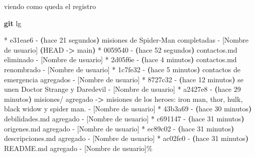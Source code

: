 \documentclass[
]{book}
\newenvironment{Shaded}{\begin{snugshade}}{\end{snugshade}}
\newcommand{\AttributeTok}[1]{\textcolor[rgb]{0.13,0.29,0.53}{#1}}
\newcommand{\ErrorTok}[1]{\textcolor[rgb]{0.64,0.00,0.00}{\textbf{#1}}}
\newcommand{\ExtensionTok}[1]{#1}
\newcommand{\FunctionTok}[1]{\textcolor[rgb]{0.13,0.29,0.53}{\textbf{#1}}}
\newcommand{\KeywordTok}[1]{\textcolor[rgb]{0.13,0.29,0.53}{\textbf{#1}}}
\newcommand{\NormalTok}[1]{#1}
\newcommand{\OperatorTok}[1]{\textcolor[rgb]{0.81,0.36,0.00}{\textbf{#1}}}
\begin{document}
viendo como queda el registro

\begin{Shaded}
\begin{Highlighting}[]
\FunctionTok{git}\NormalTok{ lg}
\end{Highlighting}
\end{Shaded}

\begin{Shaded}
\begin{Highlighting}[]
\ExtensionTok{*}\NormalTok{ e31eae6 }\AttributeTok{{-}} \ErrorTok{(}\ExtensionTok{hace}\NormalTok{ 21 segundos}\KeywordTok{)} \ExtensionTok{misiones}\NormalTok{ de Spider{-}Man completadas }\AttributeTok{{-}}\NormalTok{ [Nombre de usuario] }\ErrorTok{(}\ExtensionTok{HEAD} \AttributeTok{{-}}\OperatorTok{\textgreater{}}\NormalTok{ main}\KeywordTok{)}
\ExtensionTok{*}\NormalTok{ 0059540 }\AttributeTok{{-}} \ErrorTok{(}\ExtensionTok{hace}\NormalTok{ 52 segundos}\KeywordTok{)} \ExtensionTok{contactos.md}\NormalTok{ eliminado }\AttributeTok{{-}}\NormalTok{ [Nombre de usuario]}
\ExtensionTok{*}\NormalTok{ 2d05f6e }\AttributeTok{{-}} \ErrorTok{(}\ExtensionTok{hace}\NormalTok{ 4 minutos}\KeywordTok{)} \ExtensionTok{contactos.md}\NormalTok{ renombrado }\AttributeTok{{-}}\NormalTok{ [Nombre de usuario]}
\ExtensionTok{*}\NormalTok{ 1c7fe32 }\AttributeTok{{-}} \ErrorTok{(}\ExtensionTok{hace}\NormalTok{ 5 minutos}\KeywordTok{)} \ExtensionTok{contactos}\NormalTok{ de emergencia agregados }\AttributeTok{{-}}\NormalTok{ [Nombre de usuario]}
\ExtensionTok{*}\NormalTok{ 8727c32 }\AttributeTok{{-}} \ErrorTok{(}\ExtensionTok{hace}\NormalTok{ 12 minutos}\KeywordTok{)} \ExtensionTok{se}\NormalTok{ unen Doctor Strange y Daredevil }\AttributeTok{{-}}\NormalTok{ [Nombre de usuario]}
\ExtensionTok{*}\NormalTok{ a2427e8 }\AttributeTok{{-}} \ErrorTok{(}\ExtensionTok{hace}\NormalTok{ 29 minutos}\KeywordTok{)} \ExtensionTok{misiones/}\NormalTok{ agregado }\AttributeTok{{-}}\OperatorTok{\textgreater{}}\NormalTok{ misiones de los heroes: iron man, thor, hulk, black widow y spider man. }\AttributeTok{{-}}\NormalTok{ [Nombre de usuario]}
\ExtensionTok{*}\NormalTok{ 43b3a69 }\AttributeTok{{-}} \ErrorTok{(}\ExtensionTok{hace}\NormalTok{ 30 minutos}\KeywordTok{)} \ExtensionTok{debilidades.md}\NormalTok{ agregado }\AttributeTok{{-}}\NormalTok{ [Nombre de usuario]}
\ExtensionTok{*}\NormalTok{ c691147 }\AttributeTok{{-}} \ErrorTok{(}\ExtensionTok{hace}\NormalTok{ 31 minutos}\KeywordTok{)} \ExtensionTok{origenes.md}\NormalTok{ agregado }\AttributeTok{{-}}\NormalTok{ [Nombre de usuario]}
\ExtensionTok{*}\NormalTok{ ec89c02 }\AttributeTok{{-}} \ErrorTok{(}\ExtensionTok{hace}\NormalTok{ 31 minutos}\KeywordTok{)} \ExtensionTok{descripciones.md}\NormalTok{ agregado }\AttributeTok{{-}}\NormalTok{ [Nombre de usuario]}
\ExtensionTok{*}\NormalTok{ ac02fe0 }\AttributeTok{{-}} \ErrorTok{(}\ExtensionTok{hace}\NormalTok{ 31 minutos}\KeywordTok{)} \ExtensionTok{README.md}\NormalTok{ agregado }\AttributeTok{{-}}\NormalTok{ [Nombre de usuario]\%    }
\end{Highlighting}
\end{Shaded}
\end{document}
